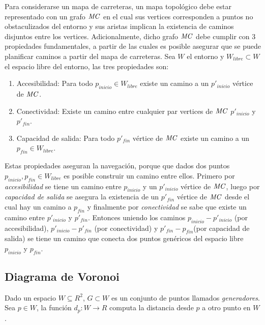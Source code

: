 Para considerarse un mapa de carreteras, un mapa topológico debe estar representado con un grafo $\mathit{MC}$ en el cual sus vertices corresponden a puntos no obstaculizados del entorno y sus aristas implican la existencia de caminos disjuntos entre los vertices. Adicionalmente, dicho grafo $\mathit{MC}$ debe cumplir con 3 propiedades fundamentales, a partir de las cuales es posible asegurar que se puede planificar caminos a partir del mapa de carreteras. Sea $W$ el entorno y $W_{libre} \subset W$ el espacio libre del entorno, las tres propiedades son:

\begin{enumerate}
  \item Accesibilidad: Para todo $p_{inicio} \in W_{libre}$ existe un camino a un $p'_{inicio}$ vértice de $\mathit{MC}$.
  \item Conectividad: Existe un camino entre cualquier par vertices de $\mathit{MC}$ $p'_{inicio}$ y $p'_{fin}$.
  \item Capacidad de salida: Para todo $p'_{fin}$ vértice de $\mathit{MC}$ existe un camino a un $p_{fin} \in W_{libre}$.
\end{enumerate}

Estas propiedades aseguran la navegación, porque que dados dos puntos $p_{inicio},p_{fin}\in W_{libre}$ es posible construir un camino entre ellos. Primero por \emph{accesibilidad} se tiene un camino entre $p_{inicio}$ y un $p'_{inicio}$ vértice de $\mathit{MC}$, luego por \emph{capacidad de salida} se asegura la existencia de un  $p'_{fin}$ vértice de $\mathit{MC}$ desde el cual hay un camino a $p_{fin}$ y finalmente por \emph{conectividad} se sabe que existe un camino entre $p'_{inicio}$ y $p'_{fin}$. Entonces uniendo los caminos $p_{inicio} - p'_{inicio}$ (por accesibilidad), $p'_{inicio} - p'_{fin}$ (por conectividad) y $p'_{fin} - p_{fin}$(por capacidad de salida) se tiene un camino que conecta dos puntos genéricos del espacio libre $p_{inicio}$ y $p_{fin}$.

\subsection{Diagrama de Voronoi}\label{sec:DV}
Dado un espacio $W \subseteq R^2$, $G \subset W$ es un conjunto de puntos llamados \emph{generadores}. Sea $p\in W$, la función $d_p : W \rightarrow R$ computa la distancia desde $p$ a otro punto en $W$. 

